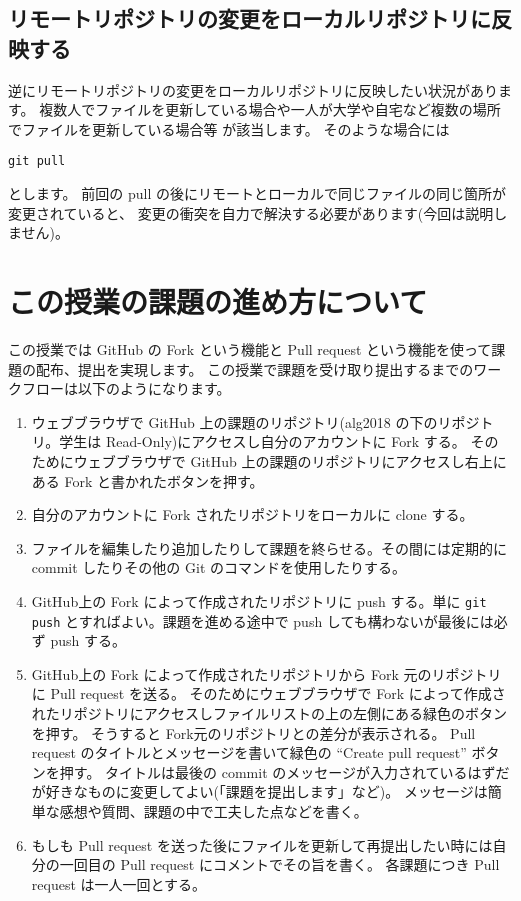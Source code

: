 \documentclass[a4paper,11pt, article]{memoir}
\begin{document}
\subsection{リモートリポジトリの変更をローカルリポジトリに反映する}
逆にリモートリポジトリの変更をローカルリポジトリに反映したい状況があります。
複数人でファイルを更新している場合や一人が大学や自宅など複数の場所でファイルを更新している場合等
が該当します。
そのような場合には
\begin{verbatim}
git pull
\end{verbatim}
とします。
前回の pull の後にリモートとローカルで同じファイルの同じ箇所が変更されていると、
変更の衝突を自力で解決する必要があります(今回は説明しません)。

\section{この授業の課題の進め方について}
この授業では GitHub の Fork という機能と Pull request という機能を使って課題の配布、提出を実現します。
この授業で課題を受け取り提出するまでのワークフローは以下のようになります。
\begin{enumerate}
\item ウェブブラウザで GitHub 上の課題のリポジトリ(alg2018 の下のリポジトリ。学生は Read-Only)にアクセスし自分のアカウントに Fork する。
そのためにウェブブラウザで GitHub 上の課題のリポジトリにアクセスし右上にある Fork と書かれたボタンを押す。
\item 自分のアカウントに Fork されたリポジトリをローカルに clone する。
\item ファイルを編集したり追加したりして課題を終らせる。その間には定期的に commit したりその他の Git のコマンドを使用したりする。
\item GitHub上の Fork によって作成されたリポジトリに push する。単に \texttt{git push} とすればよい。課題を進める途中で push しても構わないが最後には必ず push する。
\item GitHub上の Fork によって作成されたリポジトリから Fork 元のリポジトリに Pull request を送る。
そのためにウェブブラウザで Fork によって作成されたリポジトリにアクセスしファイルリストの上の左側にある緑色のボタンを押す。
そうすると Fork元のリポジトリとの差分が表示される。
Pull request のタイトルとメッセージを書いて緑色の ``Create pull request'' ボタンを押す。
タイトルは最後の commit のメッセージが入力されているはずだが好きなものに変更してよい(「課題を提出します」など)。
メッセージは簡単な感想や質問、課題の中で工夫した点などを書く。
\item もしも Pull request を送った後にファイルを更新して再提出したい時には自分の一回目の Pull request にコメントでその旨を書く。
各課題につき Pull request は一人一回とする。
\end{enumerate}
\end{document}
